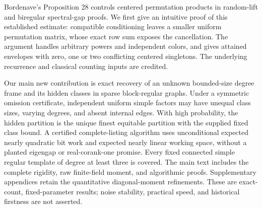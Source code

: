 Bordenave's Proposition 28 controls centered permutation products in
random-lift and biregular spectral-gap proofs. We first give an intuitive
proof of this established estimate: compatible conditioning leaves a
smaller uniform permutation matrix, whose exact row sum exposes the
cancellation. The argument handles arbitrary powers and independent
colors, and gives attained envelopes with zero, one or two conflicting
centered singletons. The underlying recurrence and classical counting
inputs are credited.

Our main new contribution is exact recovery of an unknown bounded-size
degree frame and its hidden classes in sparse block-regular graphs.
Under a symmetric omission certificate, independent uniform simple
factors may have unequal class sizes, varying degrees, and absent internal
edges. With high probability, the hidden partition is the unique finest
equitable partition with the supplied fixed class bound. A certified
complete-listing algorithm uses unconditional expected nearly quadratic
bit work and expected nearly linear working space, without a planted eigengap or
real-corank-one promise. Every fixed connected simple regular template of
degree at least three is covered. The main text includes the complete
rigidity, raw finite-field moment, and algorithmic proofs. Supplementary
appendices retain the quantitative diagonal-moment refinements.
These are exact-count, fixed-parameter results; noise stability, practical
speed, and historical firstness are not asserted.
